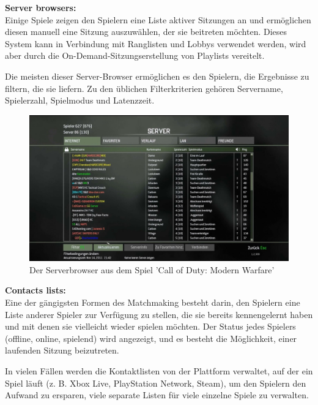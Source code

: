 \textbf{Server browsers:} \\
Einige Spiele zeigen den Spielern eine Liste aktiver Sitzungen an und ermöglichen diesen manuell eine Sitzung auszuwählen, der sie beitreten möchten. Dieses System kann in Verbindung mit Ranglisten und Lobbys verwendet werden, wird aber durch die On-Demand-Sitzungserstellung von Playlists vereitelt.

Die meisten dieser Server-Browser ermöglichen es den Spielern, die Ergebnisse zu filtern, die sie liefern. Zu den üblichen Filterkriterien gehören Servername, Spielerzahl, Spielmodus und Latenzzeit. \cite{Wikipedia.2021b}

\begin{figure}[H]
	\centering
	\includegraphics[width=120mm]{images/call_of_Duty_serverbrowser.jpg}
	\caption['Call of Duty Modern Warfare' Serverbrowser]{Der Serverbrowser aus dem Spiel 'Call of Duty: Modern Warfare'}
	\label{pic:call_of_Duty_serverbrowser}
\end{figure}

\textbf{Contacts lists:} \\
Eine der gängigsten Formen des Matchmaking besteht darin, den Spielern eine Liste anderer Spieler zur Verfügung zu stellen, die sie bereits kennengelernt haben und mit denen sie vielleicht wieder spielen möchten. Der Status jedes Spielers (offline, online, spielend) wird angezeigt, und es besteht die Möglichkeit, einer laufenden Sitzung beizutreten.

In vielen Fällen werden die Kontaktlisten von der Plattform verwaltet, auf der ein Spiel läuft (z. B. Xbox Live, PlayStation Network, Steam), um den Spielern den Aufwand zu ersparen, viele separate Listen für viele einzelne Spiele zu verwalten. \cite{Wikipedia.2021b}
